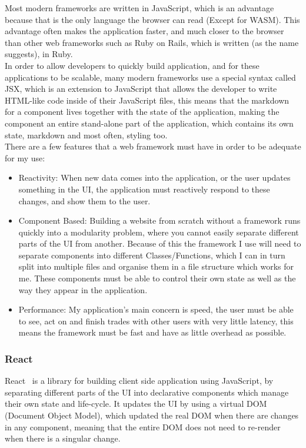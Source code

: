 \documentclass[titlepage]{article}
\begin{document}
Most modern frameworks are written in JavaScript, which is an advantage because that is the only language the browser can read (Except for WASM). This advantage often makes the application faster, and much closer to the browser than other web frameworks such as Ruby on Rails, which is written (as the name suggests), in Ruby. \\

In order to allow developers to quickly build application, and for these applications to be scalable, many modern frameworks use a special syntax called JSX, which is an extension to JavaScript that allows the developer to write HTML-like code inside of their JavaScript files, this means that the markdown for a component lives together with the state of the application, making the component an entire stand-alone part of the application, which contains its own state, markdown and most often, styling too. \\

There are a few features that a web framework must have in order to be adequate for my use:
\begin{itemize}
  \item Reactivity: When new data comes into the application, or the user updates something in the UI, the application must reactively respond to these changes, and show them to the user.
  \item Component Based: Building a website from scratch without a framework runs quickly into a modularity problem, where you cannot easily separate different parts of the UI from another. Because of this the framework I use will need to separate components into different Classes/Functions, which I can in turn split into multiple files and organise them in a file structure which works for me. These components must be able to control their own state as well as the way they appear in the application.
  \item Performance: My application's main concern is speed, the user must be able to see, act on and finish trades with other users with very little latency, this means the framework must be fast and have as little overhead as possible.
\end{itemize}

\subsubsection{React}
React~\cite{react} is a library for building client side application using JavaScript, by separating different parts of the UI into declarative components which manage their own state and life-cycle. It updates the UI by using a virtual DOM (Document Object Model), which updated the real DOM when there are changes in any component, meaning that the entire DOM does not need to re-render when there is a singular change. \\
\end{document}
